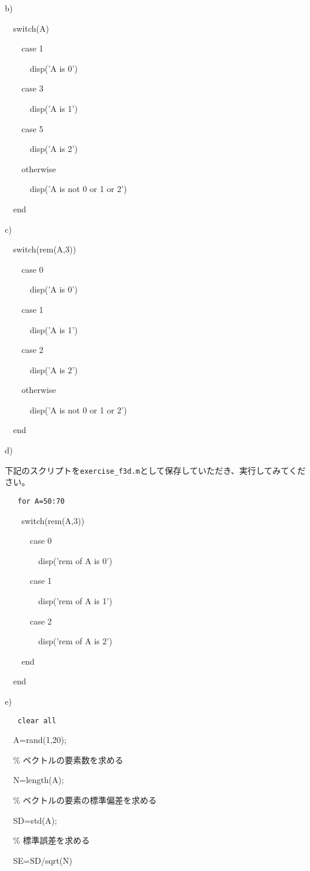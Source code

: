\documentclass{jsarticle}
\begin{document}
\bigskip

b)

{\tt

\ \ switch(A)

\ \ \ \ case 1

\ \ \ \ \ \ disp('A is 0')

\ \ \ \ case 3

\ \ \ \ \ \ disp('A is 1')

\ \ \ \ case 5

\ \ \ \ \ \ disp('A is 2')

\ \ \ \ otherwise

\ \ \ \ \ \ disp('A is not 0 or 1 or 2')

\ \ end
}

\bigskip

c)

{\tt

\ \ switch(rem(A,3))

\ \ \ \ case 0

\ \ \ \ \ \ disp('A is 0')

\ \ \ \ case 1

\ \ \ \ \ \ disp('A is 1')

\ \ \ \ case 2

\ \ \ \ \ \ disp('A is 2')

\ \ \ \ otherwise

\ \ \ \ \ \ disp('A is not 0 or 1 or 2')

\ \ end
}

\bigskip

d)

\begin{screen}
下記のスクリプトを{\tt exercise\_f3d.m}として保存していただき、実行してみてください。
\end{screen}

{\tt
\ \ for A=50:70

\ \ \ \ switch(rem(A,3))

\ \ \ \ \ \ case 0

\ \ \ \ \ \ \ \ disp('rem of A is 0')

\ \ \ \ \ \ case 1

\ \ \ \ \ \ \ \ disp('rem of A is 1')

\ \ \ \ \ \ case 2

\ \ \ \ \ \ \ \ disp('rem of A is 2')

\ \ \ \ end

\ \ end
}

\bigskip

e)

{\tt
\ \ clear all

\ \ A=rand(1,20);

\ \ \% ベクトルの要素数を求める

\ \ N=length(A);

\ \ \% ベクトルの要素の標準偏差を求める

\ \ SD=std(A);

\ \ \% 標準誤差を求める

\ \ SE=SD/sqrt(N)
}
\end{document}
